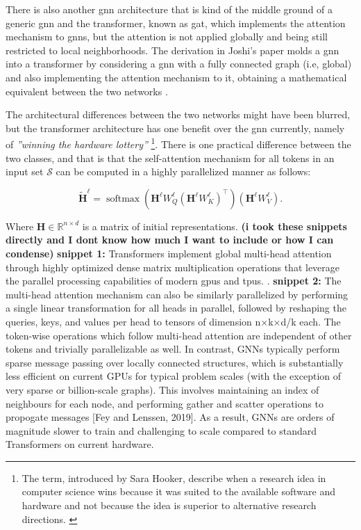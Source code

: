There is also another \gls{gnn} architecture that is kind of the middle ground of a generic \gls{gnn} and the transformer, known as \gls{gat}, which implements the attention mechanism to \gls{gnn}s, but the attention is not applied globally and being still restricted to local neighborhoods. The derivation in Joshi's paper molds a \gls{gnn} into a transformer by considering a \gls{gnn} with a fully connected graph (i.e, global) and also implementing the attention mechanism to it, obtaining a mathematical equivalent between the two networks \cite{joshi2025transformersgnn}. 

The architectural differences between the two networks might have been blurred, but the transformer architecture has one benefit over the \gls{gnn} currently, namely of \textit{''winning the hardware lottery''} \footnote{The term, introduced by Sara Hooker, describe when a
research idea in computer science wins because it was suited to the available software and hardware and not because the idea is superior to alternative research directions. \cite{hooker2020hardwarelottery}}. There is one practical difference between the two classes, and that is that 
the self-attention mechanism for all tokens in
an input set $\mathscr{S}$ can be computed in a highly parallelized manner as follows:

\[
\widetilde{\mathbf{H}}^{\ell}
=
\operatorname{softmax}
\left(
\mathbf{H}^{\ell}{W}_{Q}^{\ell}
\left(
\mathbf{H}^{\ell}{W}_{K}^{\ell}
\right)^{\top}
\right)
\left(
\mathbf{H}^{\ell}{W}_{V}^{\ell}
\right).
\]

Where $\mathbf{H} \in \mathbb{R}^{n \times d}$ is a matrix of initial representations. 
\textbf{(i took these snippets directly and I dont know how much I want to include or how I can condense)} 
\textbf{snippet 1:} Transformers implement global multi-head attention through highly optimized dense matrix multiplication operations that leverage the parallel processing capabilities of modern \gls{gpu}s and \gls{tpu}s. \cite{joshi2025transformersgnn}.
\textbf{snippet 2:} The multi-head attention mechanism can also be similarly parallelized by performing a single linear
transformation for all heads in parallel, followed by reshaping the queries, keys, and values per head
to tensors of dimension n×k×d/k each. The token-wise operations which follow multi-head
attention are independent of other tokens and trivially parallelizable as well.
In contrast, GNNs typically perform sparse message passing over locally connected structures, which
is substantially less efficient on current GPUs for typical problem scales (with the exception of very
sparse or billion-scale graphs). This involves maintaining an index of neighbours for each node,
and performing gather and scatter operations to propogate messages [Fey and Lenssen, 2019]. As a
result, GNNs are orders of magnitude slower to train and challenging to scale compared to standard
Transformers on current hardware.

